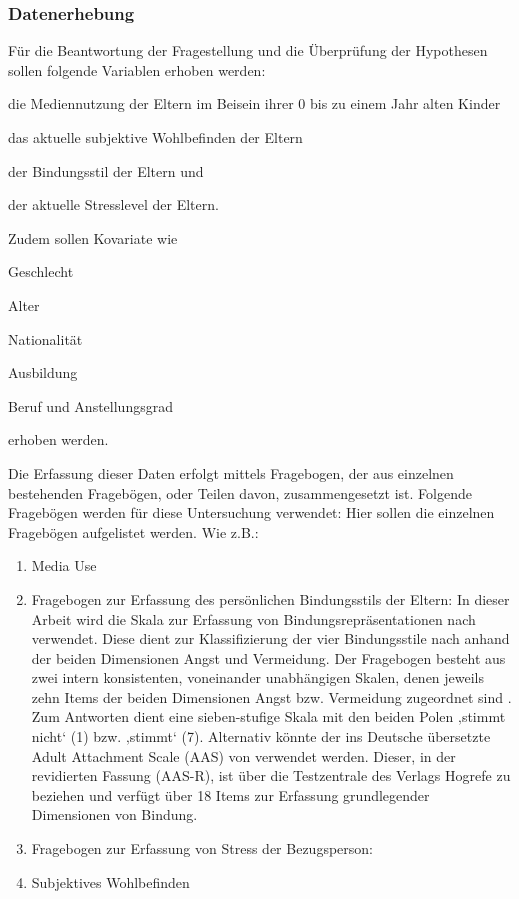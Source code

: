 \subsubsection{Datenerhebung}
Für die Beantwortung der Fragestellung und die Überprüfung der Hypothesen sollen folgende Variablen erhoben werden: 
\begin{seriate}
    \item die Mediennutzung der Eltern im Beisein ihrer 0 bis zu einem Jahr alten Kinder
    \item das aktuelle subjektive Wohlbefinden der Eltern
    \item der Bindungsstil der Eltern und
    \item der aktuelle Stresslevel der Eltern.
\end{seriate}

Zudem sollen Kovariate wie 
\begin{seriate}
    \item Geschlecht
    \item Alter
    \item Nationalität
    \item Ausbildung
    \item Beruf und Anstellungsgrad
\end{seriate}
erhoben werden.

Die Erfassung dieser Daten erfolgt mittels Fragebogen, der aus einzelnen bestehenden Fragebögen, oder Teilen davon, zusammengesetzt ist. Folgende Fragebögen werden für diese Untersuchung verwendet:
Hier sollen die einzelnen Fragebögen aufgelistet werden. Wie z.B.:
\begin{enumerate}
    \item Media Use
    \item Fragebogen zur Erfassung des persönlichen Bindungsstils der Eltern: 
In dieser Arbeit wird die Skala zur Erfassung von Bindungsrepräsentationen nach  verwendet. Diese dient zur Klassifizierung der vier Bindungsstile nach  anhand der beiden Dimensionen Angst und Vermeidung. Der Fragebogen besteht aus zwei intern konsistenten, voneinander unabhängigen Skalen, denen jeweils zehn Items der beiden Dimensionen Angst bzw. Vermeidung zugeordnet sind \cite{Baadte2006}. Zum Antworten dient eine sieben-stufige Skala mit den beiden Polen ‚stimmt nicht‘ (1) bzw. ‚stimmt‘ (7). Alternativ könnte der ins Deutsche übersetzte Adult Attachment Scale (AAS) von  verwendet werden. Dieser, in der revidierten Fassung (AAS-R),  ist über die Testzentrale des Verlags Hogrefe zu beziehen und verfügt  über 18 Items zur Erfassung grundlegender Dimensionen von Bindung.
    \item Fragebogen zur Erfassung von Stress der Bezugsperson:
    
    \item Subjektives Wohlbefinden 
\end{enumerate}

